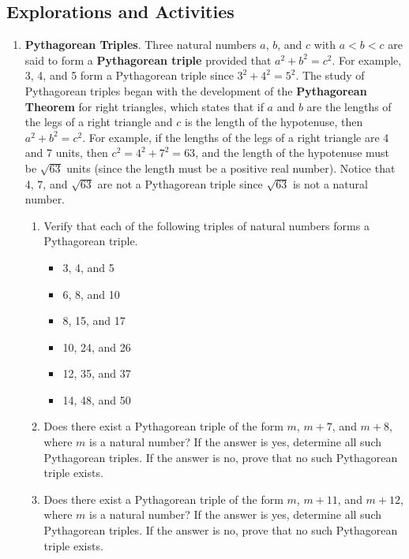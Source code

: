 \subsection*{Explorations and Activities}
\setcounter{oldenumi}{\theenumi}
\begin{enumerate} \setcounter{enumi}{\theoldenumi}
  \item \textbf{Pythagorean Triples}.  Three natural numbers $a$, $b$, and $c$ with $a < b < c$ are said to form a 
\textbf{Pythagorean triple} \label{exer:pythag}
%
\label{exer31:pythagorean}
 provided that $a^2 + b^2 = c^2$.  For example, 3, 4, and 5 form a Pythagorean triple since 
$3^2 + 4^2 = 5^2$.  The study of Pythagorean triples began with the development of the \textbf{Pythagorean Theorem} for right triangles, which states that if $a$ and $b$ are the lengths of the legs of a right triangle and $c$ is the length of the hypotenuse, then 
$a^2 + b^2 = c^2$.  For example, if the lengths of the legs of a right triangle are 4 and 7 units, then 
$c^2 = 4^2 + 7^2 = 63$, and the length of the hypotenuse must be $\sqrt{63}$ units (since the length must be a positive real number).  Notice that $4$, $7$, and $\sqrt{63}$ are not a Pythagorean triple since 
$\sqrt{63}$ is not a natural number.
\begin{enumerate}
  \item Verify that each of the following triples of natural numbers forms a Pythagorean triple.
\begin{multicols}{3}
\begin{itemize}
\item 3, 4, and 5
\item 6, 8, and 10
\item 8, 15, and 17
\item 10, 24, and 26
\item 12, 35, and 37
\item 14, 48, and 50
\end{itemize}
\end{multicols}

  \item Does there exist a Pythagorean triple of the form $m$, $m + 7$, and $m + 8$, where $m$ is a natural number?  If the answer is yes, determine all such Pythagorean triples.  If the answer is no, prove that no such Pythagorean triple exists.
  \item Does there exist a Pythagorean triple of the form $m$, $m + 11$, and $m + 12$, where $m$ is a natural number?  If the answer is yes, determine all such Pythagorean triples.  If the answer is no, prove that no such Pythagorean triple exists.
\end{enumerate}




\end{enumerate}
